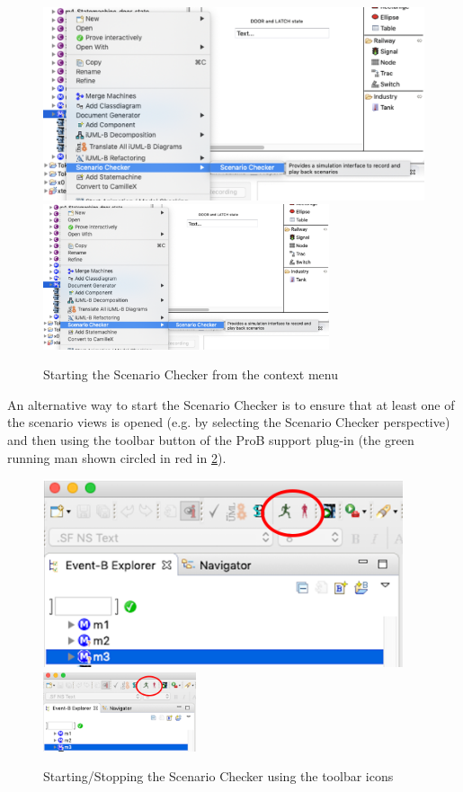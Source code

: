 \begin{figure}[!htbp]
	\centering
	\ifplastex
	\includegraphics[width=700]{figures/starting1}
	\else
	\includegraphics[width=0.75\textwidth]{figures/starting1}
	\fi
	\caption{Starting the Scenario Checker from the context menu}
	\label{fig:starting1}
\end{figure}

An alternative way to start the Scenario Checker is to ensure that at least one of the scenario views is opened (e.g. by selecting the Scenario Checker perspective) and then using the toolbar button of the ProB support plug-in (the green running man shown circled in red in \ref{fig:starting2}).

\begin{figure}[!htbp]
	\centering
	\ifplastex
	\includegraphics[width=400]{figures/starting2}
	\else
	\includegraphics[width=0.4\textwidth]{figures/starting2}
	\fi
	\caption{Starting/Stopping the Scenario Checker using the toolbar icons}
	\label{fig:starting2}
\end{figure}

